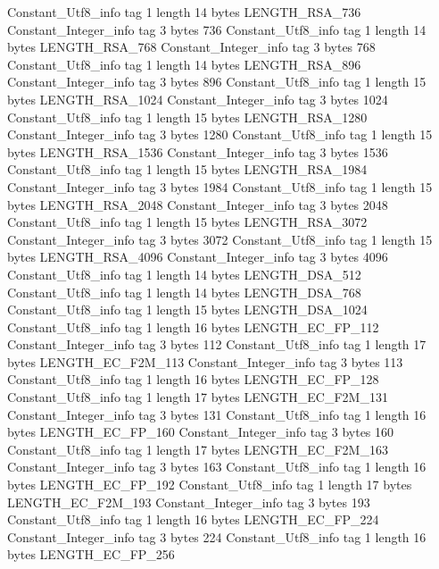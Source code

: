 {{{		}
		Constant_Utf8_info {
			tag	1
			length	14
			bytes	LENGTH_RSA_736
		}
		Constant_Integer_info {
			tag	3
			bytes	736
		}
		Constant_Utf8_info {
			tag	1
			length	14
			bytes	LENGTH_RSA_768
		}
		Constant_Integer_info {
			tag	3
			bytes	768
		}
		Constant_Utf8_info {
			tag	1
			length	14
			bytes	LENGTH_RSA_896
		}
		Constant_Integer_info {
			tag	3
			bytes	896
		}
		Constant_Utf8_info {
			tag	1
			length	15
			bytes	LENGTH_RSA_1024
		}
		Constant_Integer_info {
			tag	3
			bytes	1024
		}
		Constant_Utf8_info {
			tag	1
			length	15
			bytes	LENGTH_RSA_1280
		}
		Constant_Integer_info {
			tag	3
			bytes	1280
		}
		Constant_Utf8_info {
			tag	1
			length	15
			bytes	LENGTH_RSA_1536
		}
		Constant_Integer_info {
			tag	3
			bytes	1536
		}
		Constant_Utf8_info {
			tag	1
			length	15
			bytes	LENGTH_RSA_1984
		}
		Constant_Integer_info {
			tag	3
			bytes	1984
		}
		Constant_Utf8_info {
			tag	1
			length	15
			bytes	LENGTH_RSA_2048
		}
		Constant_Integer_info {
			tag	3
			bytes	2048
		}
		Constant_Utf8_info {
			tag	1
			length	15
			bytes	LENGTH_RSA_3072
		}
		Constant_Integer_info {
			tag	3
			bytes	3072
		}
		Constant_Utf8_info {
			tag	1
			length	15
			bytes	LENGTH_RSA_4096
		}
		Constant_Integer_info {
			tag	3
			bytes	4096
		}
		Constant_Utf8_info {
			tag	1
			length	14
			bytes	LENGTH_DSA_512
		}
		Constant_Utf8_info {
			tag	1
			length	14
			bytes	LENGTH_DSA_768
		}
		Constant_Utf8_info {
			tag	1
			length	15
			bytes	LENGTH_DSA_1024
		}
		Constant_Utf8_info {
			tag	1
			length	16
			bytes	LENGTH_EC_FP_112
		}
		Constant_Integer_info {
			tag	3
			bytes	112
		}
		Constant_Utf8_info {
			tag	1
			length	17
			bytes	LENGTH_EC_F2M_113
		}
		Constant_Integer_info {
			tag	3
			bytes	113
		}
		Constant_Utf8_info {
			tag	1
			length	16
			bytes	LENGTH_EC_FP_128
		}
		Constant_Utf8_info {
			tag	1
			length	17
			bytes	LENGTH_EC_F2M_131
		}
		Constant_Integer_info {
			tag	3
			bytes	131
		}
		Constant_Utf8_info {
			tag	1
			length	16
			bytes	LENGTH_EC_FP_160
		}
		Constant_Integer_info {
			tag	3
			bytes	160
		}
		Constant_Utf8_info {
			tag	1
			length	17
			bytes	LENGTH_EC_F2M_163
		}
		Constant_Integer_info {
			tag	3
			bytes	163
		}
		Constant_Utf8_info {
			tag	1
			length	16
			bytes	LENGTH_EC_FP_192
		}
		Constant_Utf8_info {
			tag	1
			length	17
			bytes	LENGTH_EC_F2M_193
		}
		Constant_Integer_info {
			tag	3
			bytes	193
		}
		Constant_Utf8_info {
			tag	1
			length	16
			bytes	LENGTH_EC_FP_224
		}
		Constant_Integer_info {
			tag	3
			bytes	224
		}
		Constant_Utf8_info {
			tag	1
			length	16
			bytes	LENGTH_EC_FP_256
}}}
